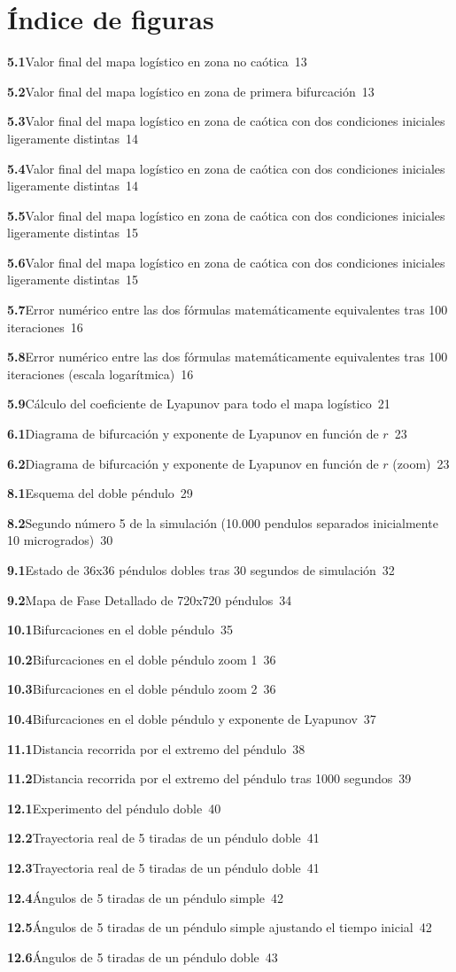 \documentclass[
  10pt,
  a4paper,
  DIV=11,
  numbers=noendperiod,
  open=any]{scrreprt}
\numberwithin{equation}{chapter}
\numberwithin{equation}{section}
\renewcommand{\[}{\begin{equation}}
\renewcommand{\]}{\end{equation}}
\begin{document}
\chapter*{Índice de figuras}

\begingroup
\parindent=0pt
\setlength{\parskip}{0.35em}
\newcommand{\figline}[3]{\noindent\textbf{#1}\;#2\dotfill\ #3\par}

\figline{5.1}{Valor final del mapa logístico en zona no caótica}{13}
\figline{5.2}{Valor final del mapa logístico en zona de primera bifurcación}{13}
\figline{5.3}{Valor final del mapa logístico en zona de caótica con dos condiciones iniciales ligeramente distintas}{14}
\figline{5.4}{Valor final del mapa logístico en zona de caótica con dos condiciones iniciales ligeramente distintas}{14}
\figline{5.5}{Valor final del mapa logístico en zona de caótica con dos condiciones iniciales ligeramente distintas}{15}
\figline{5.6}{Valor final del mapa logístico en zona de caótica con dos condiciones iniciales ligeramente distintas}{15}
\figline{5.7}{Error numérico entre las dos fórmulas matemáticamente equivalentes tras 100 iteraciones}{16}
\figline{5.8}{Error numérico entre las dos fórmulas matemáticamente equivalentes tras 100 iteraciones (escala logarítmica)}{16}
\figline{5.9}{Cálculo del coeficiente de Lyapunov para todo el mapa logístico}{21}

\figline{6.1}{Diagrama de bifurcación y exponente de Lyapunov en función de $r$}{23}
\figline{6.2}{Diagrama de bifurcación y exponente de Lyapunov en función de $r$ (zoom)}{23}

\figline{8.1}{Esquema del doble péndulo}{29}
\figline{8.2}{Segundo número 5 de la simulación (10.000 pendulos separados inicialmente 10 microgrados)}{30}

\figline{9.1}{Estado de 36x36 péndulos dobles tras 30 segundos de simulación}{32}
\figline{9.2}{Mapa de Fase Detallado de 720x720 péndulos}{34}

\figline{10.1}{Bifurcaciones en el doble péndulo}{35}
\figline{10.2}{Bifurcaciones en el doble péndulo zoom 1}{36}
\figline{10.3}{Bifurcaciones en el doble péndulo zoom 2}{36}
\figline{10.4}{Bifurcaciones en el doble péndulo y exponente de Lyapunov}{37}

\figline{11.1}{Distancia recorrida por el extremo del péndulo}{38}
\figline{11.2}{Distancia recorrida por el extremo del péndulo tras 1000 segundos}{39}

\figline{12.1}{Experimento del péndulo doble}{40}
\figline{12.2}{Trayectoria real de 5 tiradas de un péndulo doble}{41}
\figline{12.3}{Trayectoria real de 5 tiradas de un péndulo doble}{41}
\figline{12.4}{Ángulos de 5 tiradas de un péndulo simple}{42}
\figline{12.5}{Ángulos de 5 tiradas de un péndulo simple ajustando el tiempo inicial}{42}
\figline{12.6}{Ángulos de 5 tiradas de un péndulo doble}{43}
\end{document}
